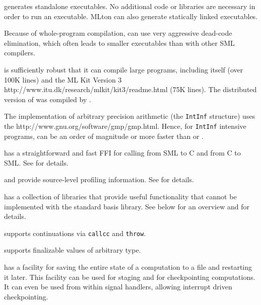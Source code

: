 \begin{description}
{\mlton} generates standalone executables.  No additional code or
libraries are necessary in order to run an executable.  MLton can also generate
statically linked executables.

Because of whole-program compilation, {\mlton} can use very aggressive 
dead-code elimination, which often leads to smaller executables than
with other SML compilers.

{\mlton} is sufficiently robust that it can compile large programs,
including itself (over 100K lines) and the
\htmladdnormallink
  {ML Kit Version 3}
  {http://www.itu.dk/research/mlkit/kit3/readme.html}
(75K lines).
The distributed version of {\mlton} was compiled by {\mlton}.

The {\mlton} implementation of arbitrary precision arithmetic (the
{\tt IntInf} structure) uses the
		  {http://www.gnu.org/software/gmp/gmp.html}.
Hence, for {\tt IntInf} intensive programs, {\mlton} can be an order
of magnitude or more faster than {\poly} or {\smlnj}.

{\mlton} has a straightforward and fast FFI for calling from SML to C
and from C to SML.  See  for details.

{\mlton} and {\mlprof} provide source-level profiling information.
See  for details.

{\mlton} has a collection of libraries that provide useful functionality that
cannot be implemented with the standard basis library.  See below for an
overview and  for details.

\begin{description}

{\mlton} supports continuations via {\tt callcc} and {\tt throw}.

{\mlton} supports finalizable values of arbitrary type.

{\mlton} has a facility for saving the entire state of a computation
to a file and restarting it later.  This facility can be used for
staging and for checkpointing computations.  It can even be used from
within signal handlers, allowing interrupt driven checkpointing.


\end{description}
\end{description}
